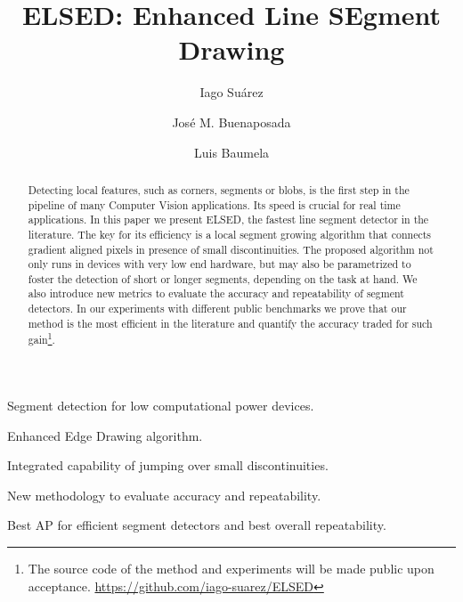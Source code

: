 \documentclass[preprint,12pt]{elsarticle}
\begin{document}
\begin{frontmatter}





\title{ELSED: Enhanced Line SEgment Drawing}

\author[lbl:graffter,lbl:upm]{Iago Su\'arez}
\author[lbl:urjc]{Jos\'e M. Buenaposada}
\author[lbl:upm]{Luis Baumela}


\begin{abstract}
Detecting local features, such as corners, segments or blobs, is the first step in the pipeline of many Computer Vision applications. Its speed is crucial for real time applications. 
In this paper we present ELSED, the fastest line segment detector in the literature. The key for its efficiency is a local segment growing algorithm that connects gradient aligned pixels in presence of small discontinuities. 
The proposed algorithm not only runs in devices with very low end hardware, but may also be parametrized to foster the detection of short or longer segments, depending on the task at hand. 
We also introduce new metrics to evaluate the accuracy and repeatability of segment detectors. In our experiments with different public benchmarks we prove that our method is the most efficient in the literature and quantify the accuracy traded for such gain\footnote{The source code of the method and experiments will be made public upon acceptance. \url{https://github.com/iago-suarez/ELSED}}.
\end{abstract}

\begin{graphicalabstract}
\end{graphicalabstract}

\begin{highlights}
\item Segment detection for low computational power devices.
\item Enhanced Edge Drawing algorithm.
\item Integrated capability of jumping over small discontinuities.
\item New methodology to evaluate accuracy and repeatability.
\item Best AP for efficient segment detectors and best overall repeatability. 
\end{highlights}


\end{frontmatter}
\end{document}
